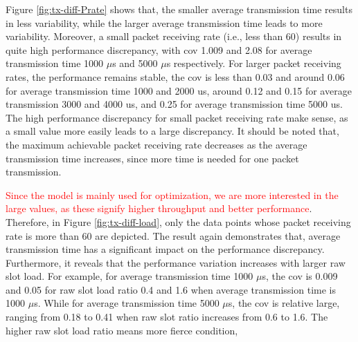 Figure \ref{fig:tx-diff-Prate} shows that, the smaller average transmission time results in less variability, while the larger average transmission time leads to more variability. Moreover, a small packet receiving rate (i.e., less than 60) results in quite high performance discrepancy, with \gls{cov} 1.009 and 2.08 for average transmission time 1000 $\mu$s and 5000 $\mu$s respectively. For larger packet receiving rates, the performance remains stable, the \gls{cov} is less than 0.03 and around 0.06 for average transmission time 1000 and 2000 us, around 0.12 and 0.15 for average transmission 3000 and 4000 us, and 0.25 for average transmission time 5000 us. The high performance discrepancy for small packet receiving rate make sense, as a small value more easily leads to a large discrepancy. It should be noted that, the maximum achievable packet receiving rate decreases as the average transmission time increases, since more time is needed for one packet transmission.

\textcolor{red}{Since the model is mainly used for optimization, we are more interested in the large values, as these signify higher throughput and better performance}. Therefore, in Figure \ref{fig:tx-diff-load}, only the data points whose packet receiving rate is more than 60 are depicted. The result again demonstrates that, average transmission time has a significant impact on the performance discrepancy. Furthermore, it reveals that the performance variation increases with larger \gls{raw} slot load. 
For example, for average transmission time 1000 $\mu$s, the \gls{cov} is 0.009 and 0.05 for \gls{raw} slot load ratio 0.4 and 1.6 when average transmission time is 1000 $\mu$s. 
While for average transmission time 5000 $\mu$s, the \gls{cov} is relative large, ranging from 0.18 to 0.41 when \gls{raw} slot ratio increases from 0.6 to 1.6. 
The higher \gls{raw} slot load ratio means more fierce condition, 



